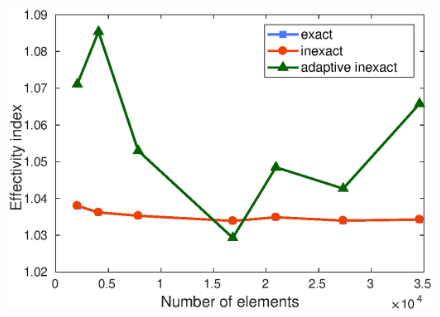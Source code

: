 \documentclass{beamer}
\begin{document}
\begin{frame}
\begin{figure}
\begin{minipage}[c]{.48\linewidth}
\includegraphics[width=\textwidth]{fig_article/effectivity_index_3_methods_number_elements.eps}     
\end{minipage}
\end{figure}
\end{frame}
\end{document}
